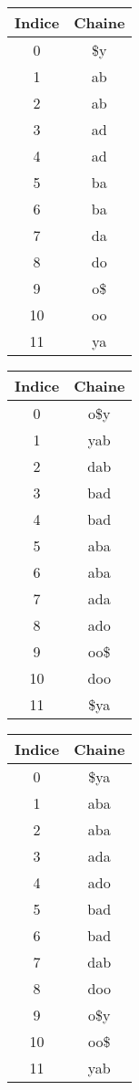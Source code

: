 
\begin{tabular}{|c|c|}
    \hline
    Indice & Chaine \\
    \hline
    0 & \$y\\
    \hline
    1 & ab   \\
    \hline
    2 & ab \\
    \hline
    3 & ad\\
    \hline
    4 & ad\\
    \hline
    5 & ba\\
    \hline
    6 & ba\\
    \hline
    7 & da\\
    \hline
    8 & do\\
    \hline
    9 & o\$\\
    \hline
    10 & oo\\
    \hline
    11 & ya\\
    \hline
\end{tabular}


\begin{tabular}{|c|c|}
    \hline
    Indice & Chaine \\
    \hline
    0 & o\$y\\
    \hline
    1 & yab   \\
    \hline
    2 & dab \\
    \hline
    3 & bad\\
    \hline
    4 & bad\\
    \hline
    5 & aba\\
    \hline
    6 & aba\\
    \hline
    7 & ada\\
    \hline
    8 & ado\\
    \hline
    9 & oo\$\\
    \hline
    10 & doo\\
    \hline
    11 & \$ya\\
    \hline
\end{tabular}

\begin{tabular}{|c|c|}
    \hline
    Indice & Chaine \\
    \hline
    0 & \$ya\\
    \hline
    1 & aba   \\
    \hline
    2 & aba \\
    \hline
    3 & ada\\
    \hline
    4 & ado\\
    \hline
    5 & bad\\
    \hline
    6 & bad\\
    \hline
    7 & dab\\
    \hline
    8 & doo\\
    \hline
    9 & o\$y\\
    \hline
    10 & oo\$\\
    \hline
    11 & yab\\
    \hline
\end{tabular}

